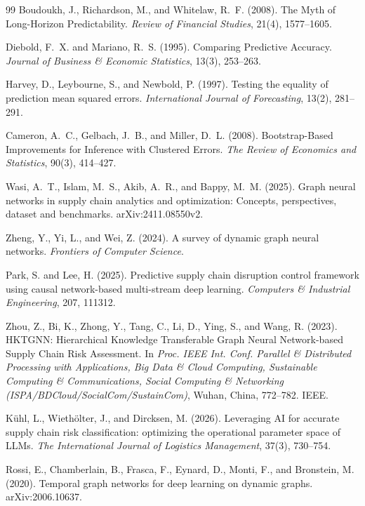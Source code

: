 \documentclass[10pt]{article}
\begin{document}
\begin{thebibliography}{99}
 Boudoukh, J., Richardson, M., and Whitelaw, R.~F. (2008). The Myth of Long-Horizon Predictability. \emph{Review of Financial Studies}, 21(4), 1577--1605.

 Diebold, F.~X. and Mariano, R.~S. (1995). Comparing Predictive Accuracy. \emph{Journal of Business \& Economic Statistics}, 13(3), 253--263.

 Harvey, D., Leybourne, S., and Newbold, P. (1997). Testing the equality of prediction mean squared errors. \emph{International Journal of Forecasting}, 13(2), 281--291.

 Cameron, A.~C., Gelbach, J.~B., and Miller, D.~L. (2008). Bootstrap-Based Improvements for Inference with Clustered Errors. \emph{The Review of Economics and Statistics}, 90(3), 414--427.

 Wasi, A.~T., Islam, M.~S., Akib, A.~R., and Bappy, M.~M. (2025). Graph neural networks in supply chain analytics and optimization: Concepts, perspectives, dataset and benchmarks. arXiv:2411.08550v2.

 Zheng, Y., Yi, L., and Wei, Z. (2024). A survey of dynamic graph neural networks. \emph{Frontiers of Computer Science}.

 Park, S. and Lee, H. (2025). Predictive supply chain disruption control framework using causal network-based multi-stream deep learning. \emph{Computers \& Industrial Engineering}, 207, 111312.

 Zhou, Z., Bi, K., Zhong, Y., Tang, C., Li, D., Ying, S., and Wang, R. (2023). HKTGNN: Hierarchical Knowledge Transferable Graph Neural Network-based Supply Chain Risk Assessment. In \emph{Proc. IEEE Int. Conf. Parallel \& Distributed Processing with Applications, Big Data \& Cloud Computing, Sustainable Computing \& Communications, Social Computing \& Networking (ISPA/BDCloud/SocialCom/SustainCom)}, Wuhan, China, 772--782. IEEE.

 K\"uhl, L., Wieth\"olter, J., and Dircksen, M. (2026). Leveraging AI for accurate supply chain risk classification: optimizing the operational parameter space of LLMs. \emph{The International Journal of Logistics Management}, 37(3), 730--754.

 Rossi, E., Chamberlain, B., Frasca, F., Eynard, D., Monti, F., and Bronstein, M. (2020). Temporal graph networks for deep learning on dynamic graphs. arXiv:2006.10637.


\end{thebibliography}
\end{document}
